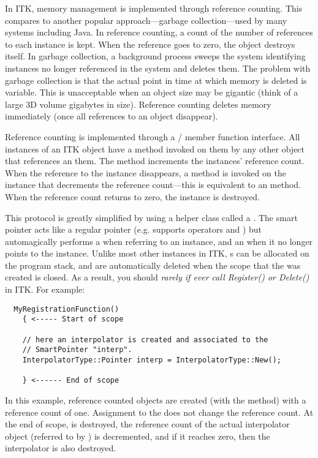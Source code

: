 In ITK, memory management is implemented through reference counting. This
compares to another popular approach---garbage collection---used by many
systems including Java. In reference counting, a count of the number of
references to each instance is kept. When the reference goes to zero, the
object destroys itself. In garbage collection, a background process sweeps
the system identifying instances no longer referenced in the system and
deletes them. The problem with garbage collection is that the actual point in
time at which memory is deleted is variable. This is unacceptable when an
object size may be gigantic (think of a large 3D volume gigabytes in
size). Reference counting deletes memory immediately (once all references to
an object disappear).

Reference counting is implemented through a /
member function interface.  All instances of an ITK object have a
 method invoked on them by any other object that references
an them. The  method increments the instances' reference
count. When the reference to the instance disappears, a 
method is invoked on the instance that decrements the reference count---this
is equivalent to an  method. When the reference count
returns to zero, the instance is destroyed.

This protocol is greatly simplified by using a helper class called a
. The smart pointer acts like a regular pointer
(e.g. supports operators \code{->} and \code{*}) but automagically performs a
 when referring to an instance, and an 
when it no longer points to the instance.  Unlike most other instances in
ITK, s can be allocated on the program stack, and are
automatically deleted when the scope that the  was created
is closed. As a result, you should \emph{rarely if ever call Register() or
Delete()} in ITK. For example:

\small
\begin{verbatim}
  MyRegistrationFunction()
    { <----- Start of scope

    // here an interpolator is created and associated to the
    // SmartPointer "interp".
    InterpolatorType::Pointer interp = InterpolatorType::New();

    } <------ End of scope
\end{verbatim}
\normalsize

In this example, reference counted objects are created (with the 
method) with a reference count of one. Assignment to the 
 does not change the reference count. At the end of scope,
 is destroyed, the reference count of the actual interpolator
object (referred to by ) is decremented, and if it reaches zero,
then the interpolator is also destroyed.

